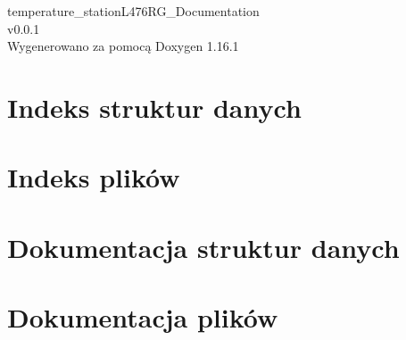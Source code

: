 \documentclass[twoside]{book}
\newcommand{\+}{\discretionary{\mbox{\scriptsize$\hookleftarrow$}}{}{}}
\newcommand{\clearemptydoublepage}{%
    \newpage{\pagestyle{empty}\cleardoublepage}%
  }
\begin{document}
  \raggedbottom
    \hypersetup{pageanchor=false,
                bookmarksnumbered=true,
                pdfencoding=unicode
               }
  \begin{titlepage}
  \vspace*{7cm}
  \begin{center}%
  {\Large temperature\+\_\+station\+L476\+RG\+\_\+\+Documentation}\\
  [1ex]\large v0.\+0.\+1 \\
  \vspace*{1cm}
  {\large Wygenerowano za pomocą Doxygen 1.16.1}\\
  \end{center}
  \end{titlepage}
  \clearemptydoublepage
  \tableofcontents
  \clearemptydoublepage
  \hypersetup{pageanchor=true}
\chapter{Indeks struktur danych}

\chapter{Indeks plików}

\chapter{Dokumentacja struktur danych}






\chapter{Dokumentacja plików}

















  \backmatter
  \newpage
  \clearemptydoublepage
  \printindex
\end{document}
